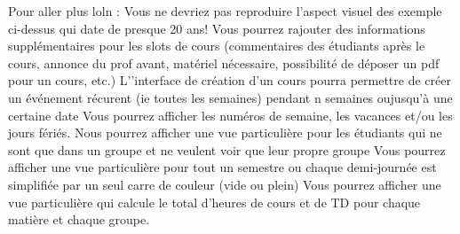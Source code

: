 Pour aller plus loln :
Vous ne devriez pas reproduire l'aspect visuel des exemple ci-dessus qui date de presque 20 ans!
Vous pourrez rajouter des informations supplémentaires pour les slots de cours (commentaires des étudiants après le cours, annonce du prof avant, matériel nécessaire, possibilité de déposer un pdf pour un cours, etc.)
L’'interface de création d'un cours pourra permettre de créer un événement récurent (ie toutes les semaines) pendant n semaines oujusqu'à une certaine date
Vous pourrez afficher les numéros de semaine, les vacances et/ou les jours fériés.
Nous pourrez afficher une vue particulière pour les étudiants qui ne sont que dans un groupe et ne veulent voir que leur propre groupe
Vous pourrez afficher une vue particulière pour tout un semestre ou chaque demi-journée est simplifiée par un seul carre de couleur (vide ou plein)
Vous pourrez afficher une vue particulière qui calcule le total d'heures de cours et de TD pour chaque matière et chaque groupe.


